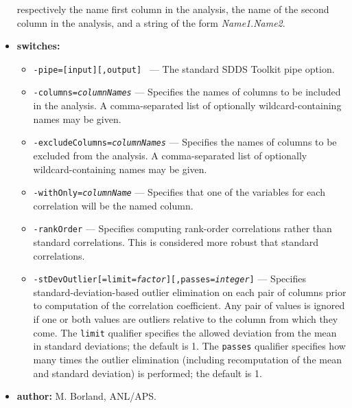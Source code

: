 \begin{itemize}
        respectively the name first column in the analysis, the name of the second column in
        the analysis, and a string of the form {\em Name1}.{\em Name2}.
\item {\bf switches:}
    \begin{itemize}
    \item {\tt -pipe=[input][,output] } --- The standard SDDS Toolkit pipe option.
    \item {\tt -columns={\em columnNames}} --- Specifies the names of columns to be included in the analysis.
        A comma-separated list of optionally wildcard-containing names may be given.
    \item {\tt -excludeColumns={\em columnNames}} --- Specifies the names of columns to be excluded from the
        analysis.  A comma-separated list of optionally wildcard-containing names may be given.
    \item {\tt -withOnly={\em columnName}} --- Specifies that one of the variables for each correlation will be
        the named column.  
    \item {\tt -rankOrder} --- Specifies computing rank-order correlations rather than standard correlations.
        This is considered more robust that standard correlations.
    \item {\tt -stDevOutlier[=limit={\em factor}][,passes={\em integer}]} --- Specifies standard-deviation-based
        outlier elimination on each pair of columns prior to computation of the correlation coefficient.
        Any pair of values is ignored if one or both values are outliers relative to the column from which they come.
        The {\tt limit} qualifier specifies the allowed deviation from the mean in standard deviations; the
        default is 1.  The {\tt passes} qualifier specifies how many times the outlier elimination (including
        recomputation of the mean and standard deviation) is performed; the default is 1.
    \end{itemize}
\item {\bf author:} M. Borland, ANL/APS.
\end{itemize}


